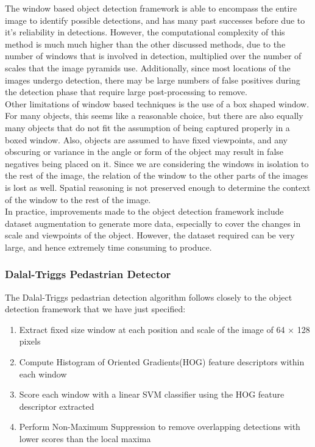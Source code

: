\documentclass[12pt]{article}
\begin{document}
The window based object detection framework is able to encompass the entire image to identify possible detections, and has many past successes before due to it's reliability in detections. However, the computational complexity of this method is much much higher than the other discussed methods, due to the number of windows that is involved in detection, multiplied over the number of scales that the image pyramids use. Additionally, since most locations of the images undergo detection, there may be large numbers of false positives during the detection phase that require large post-processing to remove. \\

Other limitations of window based techniques is the use of a box shaped window. For many objects, this seems like a reasonable choice, but there are also equally many objects that do not fit the assumption of being captured properly in a boxed window. Also, objects are assumed to have fixed viewpoints, and any obscuring or variance in the angle or form of the object may result in false negatives being placed on it. Since we are considering the windows in isolation to the rest of the image, the relation of the window to the other parts of the images is lost as well. Spatial reasoning is not preserved enough to determine the context of the window to the rest of the image.\\

In practice, improvements made to the object detection framework include dataset augmentation to generate more data, especially to cover the changes in scale and viewpoints of the object. However, the dataset required can be very large, and hence extremely time consuming to produce.

\subsubsection{Dalal-Triggs Pedastrian Detector}

The Dalal-Triggs pedastrian detection algorithm follows closely to the object detection framework that we have just specified:
\begin{enumerate}
\item Extract fixed size window at each position and scale of the image of 64 $\times$ 128 pixels
\item Compute Histogram of Oriented Gradients(HOG) feature descriptors within each window
\item Score each window with a linear SVM classifier using the HOG feature descriptor extracted
\item Perform Non-Maximum Suppression to remove overlapping detections with lower scores than the local maxima
\end{enumerate}
\end{document}
